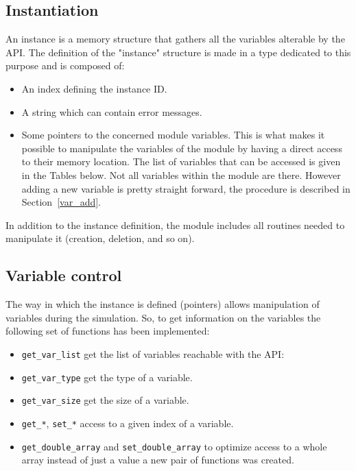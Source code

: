 \subsection{Instantiation}\label{subsec:instan}
An instance is a memory structure that gathers all the variables alterable
by the API\@. The definition of the "instance" structure is made in a \fortran{}
type dedicated to this purpose and is composed of:

\begin{itemize}
\item An index defining the instance ID\@.
\item A string which can contain error messages.
\item Some pointers to the concerned module variables. This is what makes it
  possible to manipulate the variables of the module by having a direct access
    to their memory location. The list of variables that can be accessed is
    given in the Tables below. Not all
    variables within the module are there. However adding a new variable is
    pretty straight forward, the procedure is described in
    Section~\ref{var_add}.
\end{itemize}







In addition to the instance definition, the module includes all routines needed
to manipulate it (creation, deletion, and so on).

\subsection{Variable control}
\label{subsec:var}
The way in which the instance is defined (pointers) allows manipulation of
variables during the simulation. So, to get information on the variables the
following set of functions has been implemented:

\begin{itemize}

\item \verb!get_var_list! get the list of variables reachable with the API:

\item \verb!get_var_type! get the type of a variable.

\item \verb!get_var_size! get the size of a variable.

\item \verb!get_*!, \verb!set_*! access to a given index of a
  variable.

\item \verb!get_double_array! and \verb!set_double_array! to optimize
  access to a whole array instead of just a value a new pair of
functions was created.

\end{itemize}

